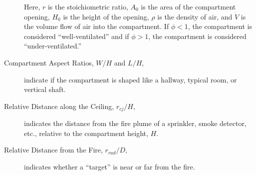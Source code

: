 \begin{description}
\ee
Here, $r$ is the stoichiometric ratio, $A_0$ is the area of the compartment opening, $H_0$ is the height of the opening, $\rho$ is the density of air, and $\dot{V}$ is the
volume flow of air into the compartment. If $\phi<1$, the compartment is considered ``well-ventilated'' and if $\phi>1$, the compartment is considered ``under-ventilated.''
\item[Compartment Aspect Ratios, $W/H$ and $L/H$,] indicate if the compartment is shaped like a hallway, typical room, or vertical shaft.
\item[Relative Distance along the Ceiling, $r_{cj}/H$,] indicates the distance from the fire plume of a sprinkler, smoke detector, etc., relative to the
compartment height, $H$.
\item[Relative Distance from the Fire, $r_{rad}/D$,] indicates whether a ``target'' is near or far from the fire.
\end{description}

